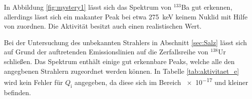 In Abbildung \ref{fig:mystery1} lässt sich das Spektrum von 
${}^{133}$Ba gut erkennen, allerdings lässt sich ein makanter 
Peak bei etwa \SI{275}{\kilo\electronvolt} keinem Nuklid 
mit Hilfe von \cite{referenz1} zuordnen. Die Aktivität besitzt auch
einen realistischen Wert.

Bei der Untersuchung des unbekannten Strahlers in Abschnitt \ref{sec:Salz}
lässt sich auf Grund der auftretenden Emissionslinien auf die Zerfallsreihe
von ${}^{138}$Ur schließen. Das Spektrum enthält einige gut erkennbare
Peaks, welche alle den angegbenen Strahlern zugeordnet werden können.
In Tabelle \ref{tab:aktivitaet_e} wird kein Fehler für $Q_\text{i}$
angegeben, da diese sich im Bereich \num{e-17} und kleiner befinden.